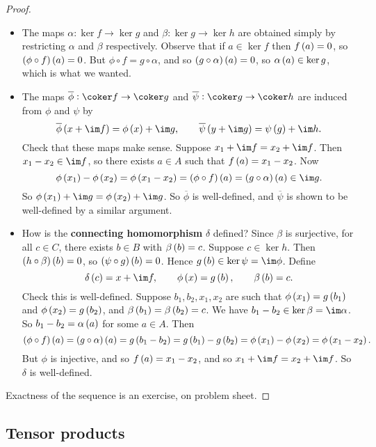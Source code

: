 \begin{proof}
\hfill
\begin{itemize}
\item The maps $ \alpha : \ker f \to \ker g $ and $ \beta : \ker g \to \ker h $ are obtained simply by restricting $ \alpha $ and $ \beta $ respectively. Observe that if $ a \in \ker f $ then $ f\br{a} = 0 $, so $ \br{\phi \circ f}\br{a} = 0 $. But $ \phi \circ f = g \circ \alpha $, and so $ \br{g \circ \alpha}\br{a} = 0 $, so $ \alpha\br{a} \in \ker g $, which is what we wanted.
\item The maps $ \overline{\phi} : \coker f \to \coker g $ and $ \overline{\psi} : \coker g \to \coker h $ are induced from $ \phi $ and $ \psi $ by
$$ \overline{\phi}\br{x + \im f} = \phi\br{x} + \im g, \qquad \overline{\psi}\br{y + \im g} = \psi\br{g} + \im h. $$
Check that these maps make sense. Suppose $ x_1 + \im f = x_2 + \im f $. Then $ x_1 - x_2 \in \im f $, so there exists $ a \in A $ such that $ f\br{a} = x_1 - x_2 $. Now
$$ \phi\br{x_1} - \phi\br{x_2} = \phi\br{x_1 - x_2} = \br{\phi \circ f}\br{a} = \br{g \circ \alpha}\br{a} \in \im g. $$
So $ \phi\br{x_1} + \im g = \phi\br{x_2} + \im g $. So $ \overline{\phi} $ is well-defined, and $ \overline{\psi} $ is shown to be well-defined by a similar argument.
\item How is the \textbf{connecting homomorphism} $ \delta $ defined? Since $ \beta $ is surjective, for all $ c \in C $, there exists $ b \in B $ with $ \beta\br{b} = c $. Suppose $ c \in \ker h $. Then $ \br{h \circ \beta}\br{b} = 0 $, so $ \br{\psi \circ g}\br{b} = 0 $. Hence $ g\br{b} \in \ker \psi = \im \phi $. Define
$$ \delta\br{c} = x + \im f, \qquad \phi\br{x} = g\br{b}, \qquad \beta\br{b} = c. $$
Check this is well-defined. Suppose $ b_1, b_2, x_1, x_2 $ are such that $ \phi\br{x_1} = g\br{b_1} $ and $ \phi\br{x_2} = g\br{b_2} $, and $ \beta\br{b_1} = \beta\br{b_2} = c $. We have $ b_1 - b_2 \in \ker \beta = \im \alpha $. So $ b_1 - b_2 = \alpha\br{a} $ for some $ a \in A $. Then
$$ \br{\phi \circ f}\br{a} = \br{g \circ \alpha}\br{a} = g\br{b_1 - b_2} = g\br{b_1} - g\br{b_2} = \phi\br{x_1} - \phi\br{x_2} = \phi\br{x_1 - x_2}. $$
But $ \phi $ is injective, and so $ f\br{a} = x_1 - x_2 $, and so $ x_1 + \im f = x_2 + \im f $. So $ \delta $ is well-defined.
\end{itemize}
Exactness of the sequence is an exercise, on problem sheet.
\end{proof}

\subsection{Tensor products}

